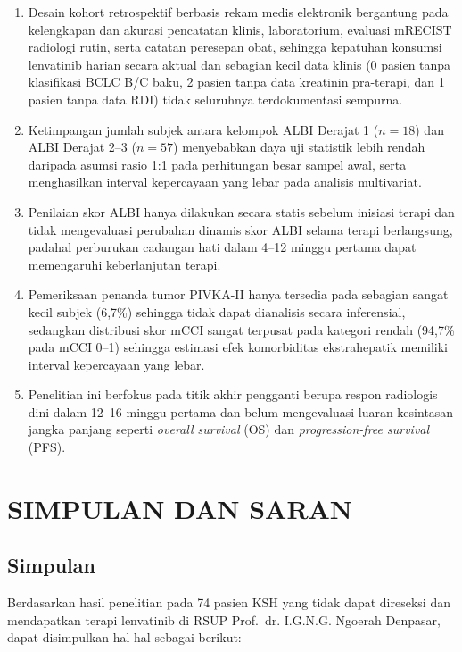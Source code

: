 \documentclass[
  indonesian,
]{report}
\providecommand{\tightlist}{%
  \setlength{\itemsep}{0pt}\setlength{\parskip}{0pt}}
\begin{document}
\begin{enumerate}
\def\labelenumi{\arabic{enumi}.}
\tightlist
\item
  Desain kohort retrospektif berbasis rekam medis elektronik bergantung
  pada kelengkapan dan akurasi pencatatan klinis, laboratorium, evaluasi
  mRECIST radiologi rutin, serta catatan peresepan obat, sehingga
  kepatuhan konsumsi lenvatinib harian secara aktual dan sebagian kecil
  data klinis (0 pasien tanpa klasifikasi BCLC B/C baku, 2 pasien tanpa
  data kreatinin pra-terapi, dan 1 pasien tanpa data RDI) tidak
  seluruhnya terdokumentasi sempurna.
\item
  Ketimpangan jumlah subjek antara kelompok ALBI Derajat 1 (\(n = 18\))
  dan ALBI Derajat 2--3 (\(n = 57\)) menyebabkan daya uji statistik
  lebih rendah daripada asumsi rasio 1:1 pada perhitungan besar sampel
  awal, serta menghasilkan interval kepercayaan yang lebar pada analisis
  multivariat.
\item
  Penilaian skor ALBI hanya dilakukan secara statis sebelum inisiasi
  terapi dan tidak mengevaluasi perubahan dinamis skor ALBI selama
  terapi berlangsung, padahal perburukan cadangan hati dalam 4--12
  minggu pertama dapat memengaruhi keberlanjutan terapi.
\item
  Pemeriksaan penanda tumor PIVKA-II hanya tersedia pada sebagian sangat
  kecil subjek (6,7\%) sehingga tidak dapat dianalisis secara
  inferensial, sedangkan distribusi skor mCCI sangat terpusat pada
  kategori rendah (94,7\% pada mCCI 0--1) sehingga estimasi efek
  komorbiditas ekstrahepatik memiliki interval kepercayaan yang lebar.
\item
  Penelitian ini berfokus pada titik akhir pengganti berupa respon
  radiologis dini dalam 12--16 minggu pertama dan belum mengevaluasi
  luaran kesintasan jangka panjang seperti \emph{overall survival} (OS)
  dan \emph{progression-free survival} (PFS).
\end{enumerate}

\chapter{SIMPULAN DAN SARAN}\label{simpulan-dan-saran}

\section{Simpulan}\label{simpulan}

Berdasarkan hasil penelitian pada 74 pasien KSH yang tidak dapat
direseksi dan mendapatkan terapi lenvatinib di RSUP Prof.~dr. I.G.N.G.
Ngoerah Denpasar, dapat disimpulkan hal-hal sebagai berikut:
\end{document}
